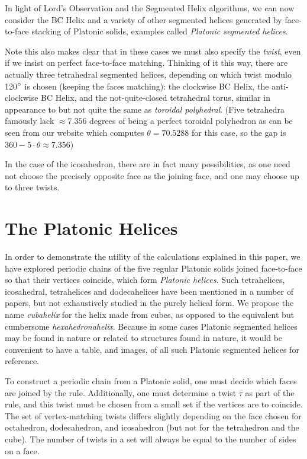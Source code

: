 \documentclass[11pt]{article}
\begin{document}
{In light of Lord's Observation and the Segmented Helix algorithms, we can now
consider the BC Helix and a variety of other segmented helices generated by
face-to-face stacking of Platonic solids, examples called {\em Platonic segmented helices}.

Note this also makes clear that in these cases we must also specify the {\em twist},
even if we insist on perfect face-to-face matching. Thinking of it this
way, there are actually three tetrahedral segmented helices,
depending on which twist modulo 120$\degree$
is chosen (keeping the faces matching): the clockwise BC Helix, the anti-clockwise BC Helix, and the
not-quite-closed tetrahedral torus, similar in appearance to but not quite the same as
{\em toroidal polyhedral}\cite{wiki:toroidalpolyhedra}.
(Five tetrahedra famously lack $\approx 7.356$ degrees of being a perfect toroidal polyhedron
as can be seen from our website which computes $\theta = 70.5288$ for this case,
so the gap is $360 - 5 \cdot \theta \approx 7.356$)

In the case of the icosahedron, there are in fact many possibilities,
as one need not choose the precisely opposite face as the joining face, and
one may choose up to three twists.


\section{The Platonic Helices}

\label{sec:platonic}

In order to demonstrate the utility of the calculations explained in this paper, we have explored
periodic chains of the five regular Platonic solids joined face-to-face so that their vertices coincide,
which form {\em Platonic helices.}
Such tetrahelices, icosahedral, tetrahelices and dodecahelices
have been mentioned in a number of papers\cite{elgersma2016quadrahelix,babiker2012combinatorial,lord2001sphere}, but not exhaustively studied in
the purely helical form.
We propose the name {\em cubahelix} for the helix made from cubes, as opposed to the equivalent
but cumbersome {\em hexahedronahelix}.
Because in some cases Platonic segmented helices may be found in nature or
related to structures found in nature\cite{lord2004gamma,pearce1990structure},
it would be convenient to have a table, and images, of all such Platonic segmented helices for reference.

To construct a periodic chain from a Platonic solid, one must decide which faces are joined by the rule.
Additionally, one must determine a twist
$\tau$ as part of the rule, and this twist must be chosen from a small set if the vertices are to coincide.
The set of vertex-matching twists differs slightly depending on the face chosen for octahedron, dodecahedron, and icosahedron
(but not for the tetrahedron and the cube). The number of twists in a set will always be equal to the number of sides on a face.

}
\end{document}
